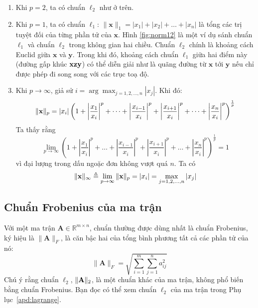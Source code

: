 \begin{enumerate}
\item Khi $p = 2$, ta có chuẩn $\ell_2$ như ở trên.

\item Khi $p = 1$, ta có chuẩn $\ell_1$:
$\|\mathbf{x}\|_1 = |x_1| + |x_2| + \dots +|x_n|$ là tổng các trị tuyệt đối
của từng phần tử của $\mathbf{x}$. Hình \ref{fig:norm12} là một ví dụ  sánh
chuẩn $\ell_1$ và chuẩn $\ell_2$ trong không gian hai chiều. Chuẩn $\ell_2$
chính là khoảng cách Euclid giữa $\mathbf{x} $ và
$\mathbf{y}$. Trong khi đó, khoảng cách chuẩn $\ell_1$ giữa hai điểm này
(đường gấp khúc $\mathbf{x}\mathbf{z}\mathbf{y}$) có thể diễn giải như là quãng đường từ $\mathbf{x}
$ tới $\mathbf{y}$ nếu chỉ được phép đi song song với các trục toạ độ.

\item Khi $p \rightarrow \infty $, giả sử
$i = \arg\max_{j=1, 2, \dots, n} |x_j|$. Khi đó:
\begin{equation}
\|\mathbf{x}\|_p = |x_i|\left(1 + \left|\frac{x_1}{x_i}\right|^p +
\dots +
\left|\frac{x_{i-1}}{x_i}\right|^p + \left|\frac{x_{i+1}}{x_i}\right|^p
+ \dots +\left|\frac{x_{n}}{x_i}\right|^p\right)^{\frac{1}
{p}}
\end{equation}
Ta thấy rằng
\begin{equation}
\lim_{p \rightarrow \infty}\left(1 + \left|\frac{x_1}{x_i}\right|^p +
\dots +
\left|\frac{x_{i-1}}{x_i}\right|^p + \left|\frac{x_{i+1}}{x_i}\right|^p
+ \dots +\left|\frac{x_{n}}{x_i}\right|^p\right)^{\frac{1}{p}} = 1
\end{equation}
vì đại lượng trong dấu ngoặc đơn không vượt quá $n$. Ta có
\begin{equation}
\|\mathbf{x}\|_{\infty} \triangleq \lim_{p \rightarrow \infty} \|\mathbf{x}\|_{p} =
|x_i| = \max_{j=1, 2, \dots, n} | x_j|
\end{equation}

\end{enumerate}

\subsection{Chuẩn Frobenius của ma trận}
Với một ma trận $\mathbf{A} \in \mathbb{R}^{m\times n}$, chuẩn thường được dùng
nhất là chuẩn Frobenius, ký hiệu là $\|\mathbf{A}\|_F$, là căn bậc hai của tổng
bình phương tất cả các phần tử của nó:
\begin{equation*}
\|\mathbf{A}\|_F = \sqrt{\sum_{i = 1}^m \sum_{j = 1}^n a_{ij}^2}
\end{equation*}
Chú ý rằng chuẩn $\ell_2$, $\|\mathbf{A}\|_2$, là một chuẩn khác của ma trận, không phổ biến bằng
chuẩn Frobenius. Bạn đọc có thể xem chuẩn $\ell_2$ của ma trận trong Phụ lục~\ref{apd:lagrange}.

